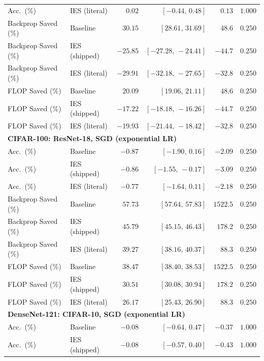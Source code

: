 \documentclass{article}
\newcommand{\win}[1]{\cellcolor{tgwin}#1}
\newcommand{\lose}[1]{\cellcolor{tglose}#1}
\theoremstyle{plain}
\theoremstyle{definition}
\theoremstyle{remark}
\begin{document}
\begin{longtable}{llrrrr}
Acc.\ (\%) & IES (literal) & \win{$0.02$} & $[-0.44,\,0.48]$ & $0.13$ & $1.000$ \\
Backprop Saved (\%) & Baseline & \win{$30.15$} & $[28.61,\,31.69]$ & $48.6$ & $0.250$ \\
Backprop Saved (\%) & IES (shipped) & \lose{$-25.85$} & $[-27.28,\,-24.41]$ & $-44.7$ & $0.250$ \\
Backprop Saved (\%) & IES (literal) & \lose{$-29.91$} & $[-32.18,\,-27.65]$ & $-32.8$ & $0.250$ \\
FLOP Saved (\%) & Baseline & \win{$20.09$} & $[19.06,\,21.11]$ & $48.6$ & $0.250$ \\
FLOP Saved (\%) & IES (shipped) & \lose{$-17.22$} & $[-18.18,\,-16.26]$ & $-44.7$ & $0.250$ \\
FLOP Saved (\%) & IES (literal) & \lose{$-19.93$} & $[-21.44,\,-18.42]$ & $-32.8$ & $0.250$ \\
\midrule
\multicolumn{6}{l}{\textbf{CIFAR-100: ResNet-18, SGD (exponential LR)}} \\
\midrule
Acc.\ (\%) & Baseline & \lose{$-0.87$} & $[-1.90,\,0.16]$ & $-2.09$ & $0.250$ \\
Acc.\ (\%) & IES (shipped) & \lose{$-0.86$} & $[-1.55,\,-0.17]$ & $-3.09$ & $0.250$ \\
Acc.\ (\%) & IES (literal) & \lose{$-0.77$} & $[-1.64,\,0.11]$ & $-2.18$ & $0.250$ \\
Backprop Saved (\%) & Baseline & \win{$57.73$} & $[57.64,\,57.83]$ & $1522.5$ & $0.250$ \\
Backprop Saved (\%) & IES (shipped) & \win{$45.79$} & $[45.15,\,46.43]$ & $178.2$ & $0.250$ \\
Backprop Saved (\%) & IES (literal) & \win{$39.27$} & $[38.16,\,40.37]$ & $88.3$ & $0.250$ \\
FLOP Saved (\%) & Baseline & \win{$38.47$} & $[38.40,\,38.53]$ & $1522.5$ & $0.250$ \\
FLOP Saved (\%) & IES (shipped) & \win{$30.51$} & $[30.08,\,30.94]$ & $178.2$ & $0.250$ \\
FLOP Saved (\%) & IES (literal) & \win{$26.17$} & $[25.43,\,26.90]$ & $88.3$ & $0.250$ \\
\midrule
\multicolumn{6}{l}{\textbf{DenseNet-121: CIFAR-10, SGD (exponential LR)}} \\
\midrule
Acc.\ (\%) & Baseline & \lose{$-0.08$} & $[-0.64,\,0.47]$ & $-0.37$ & $1.000$ \\
Acc.\ (\%) & IES (shipped) & \lose{$-0.08$} & $[-0.57,\,0.40]$ & $-0.43$ & $1.000$ \\

\end{longtable}
\end{document}
